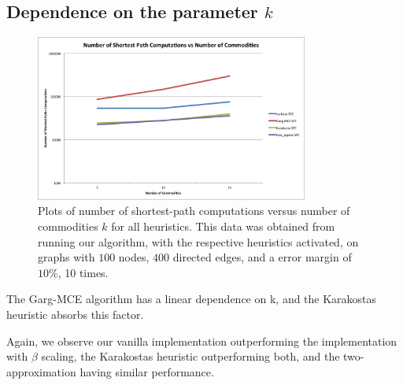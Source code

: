 \subsection{Dependence on the parameter $k$} \begin{figure} \begin{center}
\mbox{\includegraphics[width=0.8\textwidth]{figures/commodities.png}}
\caption{Plots of number of shortest-path computations versus number of
commodities $k$ for all heuristics. This data was obtained from running our
algorithm, with the respective heuristics activated, on graphs with $100$
nodes, $400$ directed edges, and a error margin of $10\%$, 10 times.  }
\end{center} \end{figure}

The Garg-MCE algorithm has a linear dependence on k, and the Karakostas
heuristic absorbs this factor.

Again, we observe our vanilla implementation outperforming the implementation
with $\beta$ scaling, the Karakostas heuristic outperforming both, and the
two-approximation having similar performance.

